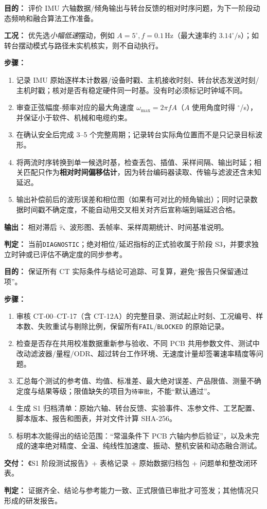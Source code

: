 \textbf{目的：} 评价 IMU 六轴数据/倾角输出与转台反馈的相对时序问题，为下一阶段动态频响和融合算法工作准备。
\par\textbf{工况：} 优先选\emph{小幅低速}摆动，例如 $A=5^\circ,f=0.1\,\mathrm{Hz}$（最大速率约 $3.14^\circ/\mathrm s$）；如转台摆动模式与路径未实机核实，则不自动执行。
\par\textbf{步骤：}
\begin{enumerate}
\item 记录 IMU 原始逐样本计数器/设备时戳、主机接收时刻、转台状态发送时刻/主机时戳；核对是否有稳定硬件同一时基。没有时必须标记时钟域不同。
\item 审查正弦幅度-频率对应的最大角速度 $\omega_{\max}=2\pi fA$（$A$ 使用角度时得 $^\circ$/s），并保证小于软件、机械和电缆约束。
\item 在确认安全后完成 3--5 个完整周期；记录转台实际角位置而不是只记录目标波形。
\item 将两流时序转换到单一候选时基，检查丢包、插值、采样间隔、输出时延；相关匹配只作为\textbf{相对时间偏移估计}，因为转台编码器读取、传输与滤波还含未知延迟。
\item 输出补偿前后的波形误差和相位图（如果有可对比的倾角输出）；同时记录数据时间戳不确定度，不能自动用交叉相关对齐后宣称端到端延迟合格。
\end{enumerate}
\textbf{输出：} 相对滞后 $\hat\tau$、波形图、丢帧率、采样周期统计、时间基准说明。
\par\textbf{判定：} 当前\texttt{DIAGNOSTIC}；绝对相位/延迟指标的正式验收属于阶段 S3，并要求独立时钟或已评估不确定度的同步参考。

\textbf{目的：} 保证所有 CT 实际条件与结论可追踪、可复算，避免“报告只保留通过项”。
\par\textbf{步骤：}
\begin{enumerate}
\item 审核 CT-00--CT-17（含 CT-12A）的完整目录、测试起止时刻、工况编号、样本数、失败重试与剔除比例，保留所有\texttt{FAIL}/\texttt{BLOCKED} 的原始记录。
\item 检查是否存在共用校准数据重新参与验收、不同 PCB 共用参数文件、测试中改动滤波器/量程/ODR、超过转台工作环境、无速度计量却签署速率精度等问题。
\item 汇总每个测试的参考值、均值、标准差、最大绝对误差、产品限值、测量不确定度与结果等级；限值缺失的项目为\texttt{待审批}，不能“默认通过”。
\item 生成 S1 归档清单：原始六轴、转台反馈、实验事件、冻参文件、工艺配置、脚本版本、报告和图表，并对文件计算 SHA-256。
\item 标明本次能得出的结论范围：“常温条件下 PCB 六轴内参后验证”，以及未完成的速率绝对精度、全温、纯线性加速度、振动、整机安装和动态融合测试。
\end{enumerate}
\textbf{交付：} 《S1 阶段测试报告》+ 表格记录 + 原始数据归档包 + 问题单和整改闭环表。
\par\textbf{判定：} 证据齐全、结论与参考能力一致、正式限值已审批才可签发；其他情况只形成\pilot 的研发报告。

